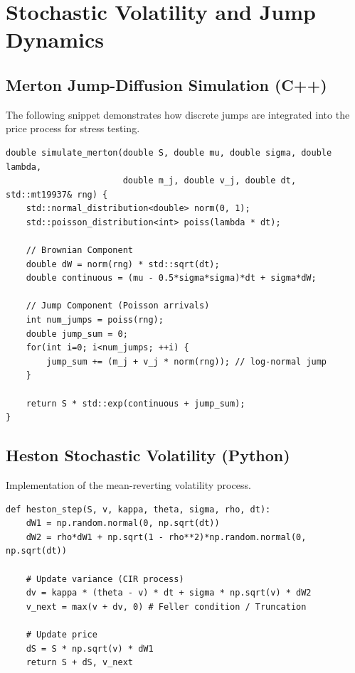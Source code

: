 \section{Stochastic Volatility and Jump Dynamics}
\subsection{Merton Jump-Diffusion Simulation (C++)}
The following snippet demonstrates how discrete jumps are integrated into the price process for stress testing.

\begin{lstlisting}[style=cppstyle, caption={Merton Jump-Diffusion implementation}, label={lst:merton}]
double simulate_merton(double S, double mu, double sigma, double lambda, 
                       double m_j, double v_j, double dt, std::mt19937& rng) {
    std::normal_distribution<double> norm(0, 1);
    std::poisson_distribution<int> poiss(lambda * dt);
    
    // Brownian Component
    double dW = norm(rng) * std::sqrt(dt);
    double continuous = (mu - 0.5*sigma*sigma)*dt + sigma*dW;
    
    // Jump Component (Poisson arrivals)
    int num_jumps = poiss(rng);
    double jump_sum = 0;
    for(int i=0; i<num_jumps; ++i) {
        jump_sum += (m_j + v_j * norm(rng)); // log-normal jump
    }
    
    return S * std::exp(continuous + jump_sum);
}
\end{lstlisting}

\subsection{Heston Stochastic Volatility (Python)}
Implementation of the mean-reverting volatility process.

\begin{lstlisting}[style=pythonstyle, caption={Heston Model paths}, label={lst:heston}]
def heston_step(S, v, kappa, theta, sigma, rho, dt):
    dW1 = np.random.normal(0, np.sqrt(dt))
    dW2 = rho*dW1 + np.sqrt(1 - rho**2)*np.random.normal(0, np.sqrt(dt))
    
    # Update variance (CIR process)
    dv = kappa * (theta - v) * dt + sigma * np.sqrt(v) * dW2
    v_next = max(v + dv, 0) # Feller condition / Truncation
    
    # Update price
    dS = S * np.sqrt(v) * dW1
    return S + dS, v_next
\end{lstlisting}

